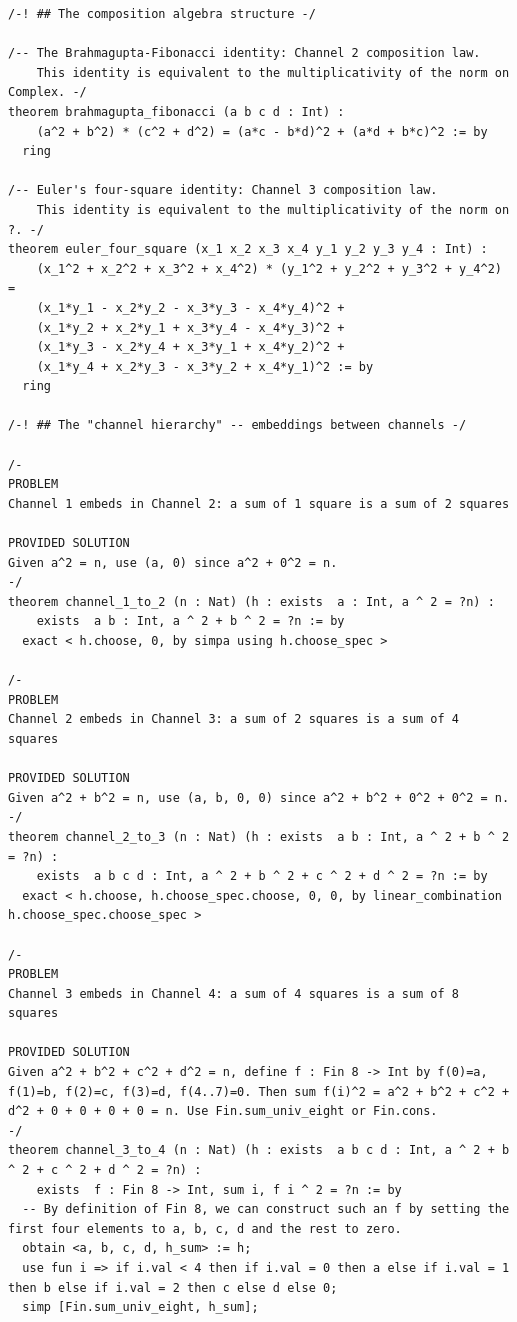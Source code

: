 \documentclass[11pt,openright,twoside]{book}
\theoremstyle{definition}
\begin{document}
\begin{lstlisting}[style=lean]
/-! ## The composition algebra structure -/

/-- The Brahmagupta-Fibonacci identity: Channel 2 composition law.
    This identity is equivalent to the multiplicativity of the norm on Complex. -/
theorem brahmagupta_fibonacci (a b c d : Int) :
    (a^2 + b^2) * (c^2 + d^2) = (a*c - b*d)^2 + (a*d + b*c)^2 := by
  ring

/-- Euler's four-square identity: Channel 3 composition law.
    This identity is equivalent to the multiplicativity of the norm on ?. -/
theorem euler_four_square (x_1 x_2 x_3 x_4 y_1 y_2 y_3 y_4 : Int) :
    (x_1^2 + x_2^2 + x_3^2 + x_4^2) * (y_1^2 + y_2^2 + y_3^2 + y_4^2) =
    (x_1*y_1 - x_2*y_2 - x_3*y_3 - x_4*y_4)^2 +
    (x_1*y_2 + x_2*y_1 + x_3*y_4 - x_4*y_3)^2 +
    (x_1*y_3 - x_2*y_4 + x_3*y_1 + x_4*y_2)^2 +
    (x_1*y_4 + x_2*y_3 - x_3*y_2 + x_4*y_1)^2 := by
  ring

/-! ## The "channel hierarchy" -- embeddings between channels -/

/-
PROBLEM
Channel 1 embeds in Channel 2: a sum of 1 square is a sum of 2 squares

PROVIDED SOLUTION
Given a^2 = n, use (a, 0) since a^2 + 0^2 = n.
-/
theorem channel_1_to_2 (n : Nat) (h : exists  a : Int, a ^ 2 = ?n) :
    exists  a b : Int, a ^ 2 + b ^ 2 = ?n := by
  exact < h.choose, 0, by simpa using h.choose_spec >

/-
PROBLEM
Channel 2 embeds in Channel 3: a sum of 2 squares is a sum of 4 squares

PROVIDED SOLUTION
Given a^2 + b^2 = n, use (a, b, 0, 0) since a^2 + b^2 + 0^2 + 0^2 = n.
-/
theorem channel_2_to_3 (n : Nat) (h : exists  a b : Int, a ^ 2 + b ^ 2 = ?n) :
    exists  a b c d : Int, a ^ 2 + b ^ 2 + c ^ 2 + d ^ 2 = ?n := by
  exact < h.choose, h.choose_spec.choose, 0, 0, by linear_combination h.choose_spec.choose_spec >

/-
PROBLEM
Channel 3 embeds in Channel 4: a sum of 4 squares is a sum of 8 squares

PROVIDED SOLUTION
Given a^2 + b^2 + c^2 + d^2 = n, define f : Fin 8 -> Int by f(0)=a, f(1)=b, f(2)=c, f(3)=d, f(4..7)=0. Then sum f(i)^2 = a^2 + b^2 + c^2 + d^2 + 0 + 0 + 0 + 0 = n. Use Fin.sum_univ_eight or Fin.cons.
-/
theorem channel_3_to_4 (n : Nat) (h : exists  a b c d : Int, a ^ 2 + b ^ 2 + c ^ 2 + d ^ 2 = ?n) :
    exists  f : Fin 8 -> Int, sum i, f i ^ 2 = ?n := by
  -- By definition of Fin 8, we can construct such an f by setting the first four elements to a, b, c, d and the rest to zero.
  obtain <a, b, c, d, h_sum> := h;
  use fun i => if i.val < 4 then if i.val = 0 then a else if i.val = 1 then b else if i.val = 2 then c else d else 0;
  simp [Fin.sum_univ_eight, h_sum];


\end{lstlisting}
\end{document}
